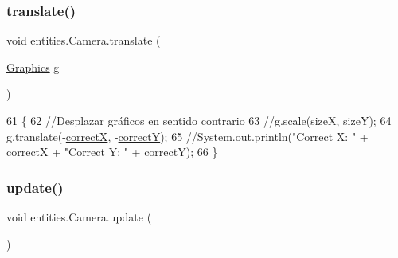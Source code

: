 \subsubsection{\texorpdfstring{translate()}{translate()}}
{\footnotesize\ttfamily void entities.\+Camera.\+translate (\begin{DoxyParamCaption}\item[{\mbox{\hyperlink{classorg_1_1newdawn_1_1slick_1_1_graphics}{Graphics}}}]{g }\end{DoxyParamCaption})\hspace{0.3cm}{\ttfamily [inline]}}


\begin{DoxyCode}
61                                       \{
62         \textcolor{comment}{//Desplazar gráficos en sentido contrario}
63         \textcolor{comment}{//g.scale(sizeX, sizeY);}
64         g.translate(-\mbox{\hyperlink{classentities_1_1_camera_aff3fca00a4578d5a45ddb9c402d1bf0e}{correctX}}, -\mbox{\hyperlink{classentities_1_1_camera_a4e9aeca687823695b7f8bd5842d063fc}{correctY}});
65         \textcolor{comment}{//System.out.println("Correct X: " + correctX + "Correct Y: " + correctY);}
66     \}
\end{DoxyCode}
\mbox{\label{classentities_1_1_camera_afc9fce5bc7a2d64ca42a04c5f34f6f8c}} 
\subsubsection{\texorpdfstring{update()}{update()}}
{\footnotesize\ttfamily void entities.\+Camera.\+update (\begin{DoxyParamCaption}{ }\end{DoxyParamCaption})\hspace{0.3cm}{\ttfamily [inline]}}


